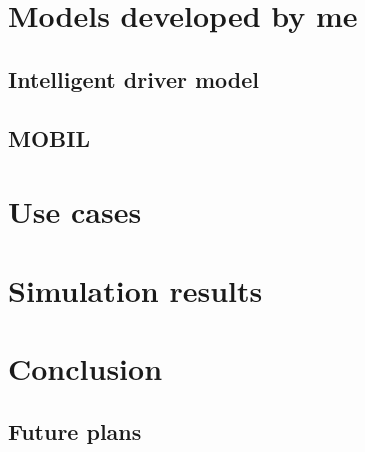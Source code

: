 \documentclass[a4paper,12pt,twoside]{book}
\begin{document}
	\chapter{Models developed by me}
		\section{Intelligent driver model}
		\section{MOBIL}
	\chapter{Use cases}
	\chapter{Simulation results}
	\chapter{Conclusion}
		\section{}
		\section{Future plans}
\end{document}
